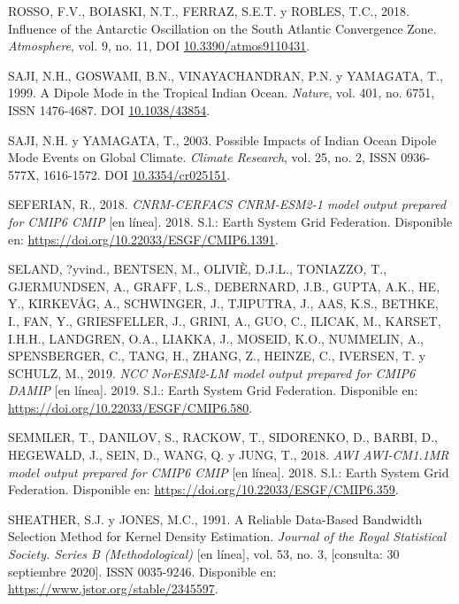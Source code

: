 \documentclass[12pt,oneside,a4paper]{reedthesis}
\newlength{\cslhangindent}
\newenvironment{CSLReferences}[2] %
 {%
  \setlength{\parindent}{0pt}
  \ifodd #1 \everypar{\setlength{\hangindent}{\cslhangindent}}\ignorespaces\fi
  \ifnum #2 > 0
  \setlength{\parskip}{#2\baselineskip}
  \fi
 }%
 {}
\begin{document}
\begin{CSLReferences}{1}{0}
\leavevmode{}%
ROSSO, F.V., BOIASKI, N.T., FERRAZ, S.E.T. y ROBLES, T.C., 2018. Influence of the {Antarctic Oscillation} on the {South Atlantic Convergence Zone}. \emph{Atmosphere}, vol. 9, no. 11, DOI \href{https://doi.org/10.3390/atmos9110431}{10.3390/atmos9110431}.

\leavevmode{}%
SAJI, N.H., GOSWAMI, B.N., VINAYACHANDRAN, P.N. y YAMAGATA, T., 1999. A Dipole Mode in the Tropical {Indian Ocean}. \emph{Nature}, vol. 401, no. 6751, ISSN 1476-4687. DOI \href{https://doi.org/10.1038/43854}{10.1038/43854}.

\leavevmode{}%
SAJI, N.H. y YAMAGATA, T., 2003. Possible Impacts of {Indian Ocean Dipole} Mode Events on Global Climate. \emph{Climate Research}, vol. 25, no. 2, ISSN 0936-577X, 1616-1572. DOI \href{https://doi.org/10.3354/cr025151}{10.3354/cr025151}.

\leavevmode{}%
SEFERIAN, R., 2018. \emph{CNRM-CERFACS CNRM-ESM2-1 model output prepared for CMIP6 CMIP} {[}en línea{]}. 2018. S.l.: Earth System Grid Federation. Disponible en: \url{https://doi.org/10.22033/ESGF/CMIP6.1391}.

\leavevmode{}%
SELAND, ?yvind., BENTSEN, M., OLIVIÈ, D.J.L., TONIAZZO, T., GJERMUNDSEN, A., GRAFF, L.S., DEBERNARD, J.B., GUPTA, A.K., HE, Y., KIRKEVÅG, A., SCHWINGER, J., TJIPUTRA, J., AAS, K.S., BETHKE, I., FAN, Y., GRIESFELLER, J., GRINI, A., GUO, C., ILICAK, M., KARSET, I.H.H., LANDGREN, O.A., LIAKKA, J., MOSEID, K.O., NUMMELIN, A., SPENSBERGER, C., TANG, H., ZHANG, Z., HEINZE, C., IVERSEN, T. y SCHULZ, M., 2019. \emph{NCC NorESM2-LM model output prepared for CMIP6 DAMIP} {[}en línea{]}. 2019. S.l.: Earth System Grid Federation. Disponible en: \url{https://doi.org/10.22033/ESGF/CMIP6.580}.

\leavevmode{}%
SEMMLER, T., DANILOV, S., RACKOW, T., SIDORENKO, D., BARBI, D., HEGEWALD, J., SEIN, D., WANG, Q. y JUNG, T., 2018. \emph{AWI AWI-CM1.1MR model output prepared for CMIP6 CMIP} {[}en línea{]}. 2018. S.l.: Earth System Grid Federation. Disponible en: \url{https://doi.org/10.22033/ESGF/CMIP6.359}.

\leavevmode{}%
SHEATHER, S.J. y JONES, M.C., 1991. A {Reliable Data-Based Bandwidth Selection Method} for {Kernel Density Estimation}. \emph{Journal of the Royal Statistical Society. Series B (Methodological)} {[}en línea{]}, vol. 53, no. 3, {[}consulta: 30 septiembre 2020{]}. ISSN 0035-9246. Disponible en: \url{https://www.jstor.org/stable/2345597}.


\end{CSLReferences}
\end{document}
